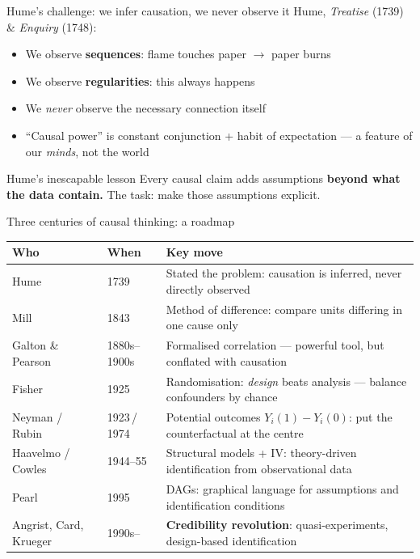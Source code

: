 \documentclass[aspectratio=169, 10pt]{beamer}
\begin{document}

\begin{frame}{Hume's challenge: we infer causation, we never observe it}
      \small Hume, \emph{Treatise} (1739) \& \emph{Enquiry} (1748):
      \begin{itemize}
        \item We observe \textbf{sequences}: flame touches paper $\to$ paper burns
        \item We observe \textbf{regularities}: this always happens
        \item We \emph{never} observe the necessary connection itself
        \item ``Causal power'' is \alert{constant conjunction + habit of expectation} ---
              a feature of our \emph{minds}, not the world
      \end{itemize}
      \smallskip
      \begin{block}{\small Hume's inescapable lesson}
        \footnotesize
        Every causal claim adds assumptions \textbf{beyond what the data contain.} The task: make those assumptions explicit.
      \end{block}
\end{frame}


\begin{frame}{Three centuries of causal thinking: a roadmap}

  {\footnotesize\renewcommand{\arraystretch}{1.35}%
  \begin{tabular}{@{}p{2.9cm} p{1.6cm} p{8.4cm}@{}}
    \toprule
    \textbf{Who} & \textbf{When} & \textbf{Key move} \\
    \midrule
    Hume              & 1739          & Stated the problem: causation is inferred, never directly observed \\
    Mill              & 1843          & Method of difference: compare units differing in one cause only \\
    Galton \& Pearson & 1880s--1900s  & Formalised correlation --- powerful tool, but \alert{conflated} with causation \\
    Fisher            & 1925          & Randomisation: \emph{design} beats analysis --- balance confounders by chance \\
    Neyman / Rubin    & 1923\,/\,1974 & Potential outcomes $Y_i(1)-Y_i(0)$: put the counterfactual at the centre \\
    Haavelmo / Cowles & 1944--55      & Structural models + IV: theory-driven identification from observational data \\
    Pearl             & 1995          & DAGs: graphical language for assumptions and identification conditions \\
    Angrist, Card, Krueger & 1990s--  & \textbf{Credibility revolution}: quasi-experiments, design-based identification \\
    \bottomrule
  \end{tabular}}
\end{frame}
\end{document}
